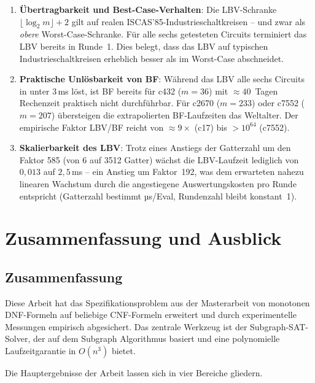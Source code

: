 ﻿\documentclass[a4paper,12pt]{article}
\theoremstyle{definition}
\begin{document}
\begin{enumerate}
  \item \textbf{Übertragbarkeit und Best-Case-Verhalten}: Die
    LBV-Schranke $\lfloor\log_2 m\rfloor + 2$ gilt auf realen
    ISCAS'85-Industrieschaltkreisen -- und zwar als \emph{obere}
    Worst-Case-Schranke.  Für alle sechs getesteten Circuits terminiert
    das LBV bereits in Runde~1.  Dies belegt, dass das LBV auf typischen
    Industrieschaltkreisen erheblich besser als im Worst-Case abschneidet.

  \item \textbf{Praktische Unlösbarkeit von BF}: Während das LBV
    alle sechs Circuits in unter $3$\,ms löst, ist BF bereits für
    c432 ($m=36$) mit ${\approx}40$~Tagen Rechenzeit praktisch
    nicht durchführbar.  Für c2670 ($m=233$) oder c7552 ($m=207$)
    übersteigen die extrapolierten BF-Laufzeiten das Weltalter.
    Der empirische Faktor LBV/BF reicht von ${\approx}9\times$ (c17)
    bis $> 10^{64}$ (c7552).

  \item \textbf{Skalierbarkeit des LBV}: Trotz eines Anstiegs der
    Gatterzahl um den Faktor 585 (von 6 auf 3512 Gatter) wächst die
    LBV-Laufzeit lediglich von $0{,}013$ auf $2{,}5$\,ms -- ein Anstieg
    um Faktor~192, was dem erwarteten nahezu linearen Wachstum durch die
    angestiegene Auswertungskosten pro Runde entspricht (Gatterzahl
    bestimmt  µs/Eval, Rundenzahl bleibt konstant~1).
\end{enumerate}

\section{Zusammenfassung und Ausblick}

\subsection{Zusammenfassung}

Diese Arbeit hat das Spezifikationsproblem aus der Masterarbeit \cite{Epp13} von
monotonen DNF-Formeln auf beliebige CNF-Formeln erweitert und durch experimentelle
Messungen empirisch abgesichert.  Das zentrale Werkzeug ist der Subgraph-SAT-Solver,
der auf dem Subgraph Algorithmus \cite{Epp26, Epp26} basiert und eine polynomielle
Laufzeitgarantie in $O(n^3)$ bietet.

Die Hauptergebnisse der Arbeit lassen sich in vier Bereiche gliedern.
\end{document}
